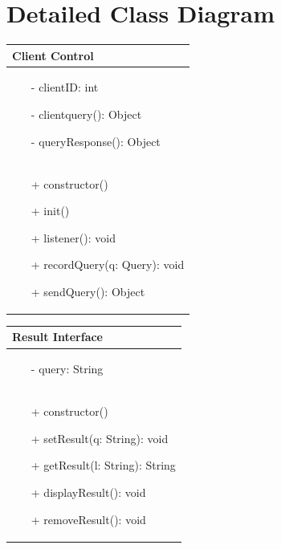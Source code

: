 \documentclass[]{article}
\begin{document}
\section{Detailed Class Diagram}
\label{sec:detailed_class_diagram}
\begin{table}[H]
\centering %
\begin{tabular}{|>{\centering\arraybackslash}p{10cm}|} %
\hline
Client Control\\
\hline
\begin{itemize}
\item[-] clientID: int
\item[-] clientquery(): Object
\item[-] queryResponse(): Object
\end{itemize}
\\
\hline
\begin{itemize}
\item[+] constructor()
\item[+] init()
\item[+] listener(): void
\item[+] recordQuery(q: Query): void
\item[+] sendQuery():  Object
\end{itemize}
\\
\hline
\end{tabular}
\end{table}
%
\begin{table}[H]
\centering
\begin{tabular}{|>{\centering\arraybackslash}p{10cm}|}
\hline
Result Interface\\
\hline
\begin{itemize}
\item[-] query: String
\end{itemize}
\\
\hline
\begin{itemize}
\item[+] constructor()
\item[+] setResult(q: String): void
\item[+] getResult(l: String): String
\item[+] displayResult(): void
\item[+] removeResult(): void
\end{itemize}
\\
\hline
\end{tabular}
\end{table}
\end{document}
